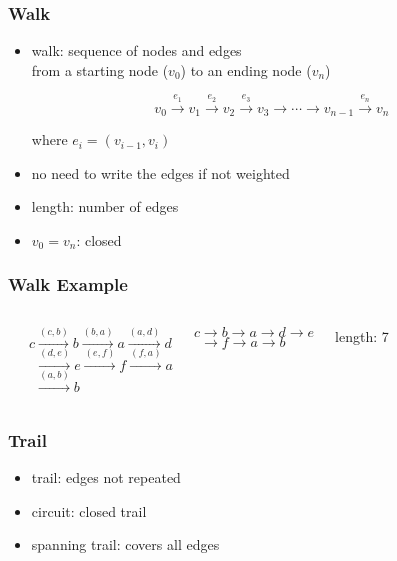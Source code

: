 \documentclass[dvipsnames]{beamer}
\begin{document}
\begin{frame}
  \frametitle{Walk}

  \begin{itemize}
    \item \alert{walk}: sequence of nodes and edges\\
      from a starting node ($v_0$) to an ending node ($v_n$)

    \[
      v_0 \xrightarrow{e_1} v_1 \xrightarrow{e_2} v_2 \xrightarrow{e_3} v_3
      \xrightarrow{} \cdots \xrightarrow{} v_{n-1} \xrightarrow{e_n} v_n
    \]

    where $e_i=(v_{i-1},v_i)$

    \item no need to write the edges if not weighted

    \pause
    \medskip
    \item \alert{length}: number of edges
    \item $v_0 = v_n$: \alert{closed}
  \end{itemize}
\end{frame}

\begin{frame}
  \frametitle{Walk Example}

  \begin{columns}
    \begin{center}
    \end{center}

    $c \xrightarrow{(c,b)} b \xrightarrow{(b,a)} a \xrightarrow{(a,d)} d$\\
    $~~\xrightarrow{(d,e)} e \xrightarrow{(e,f)} f \xrightarrow{(f,a)} a$\\
    $~~\xrightarrow{(a,b)} b$

    \medskip
    $c \rightarrow b \rightarrow a \rightarrow d \rightarrow e$\\
    $~~\rightarrow f \rightarrow a \rightarrow b$

    \bigskip
    length: 7
  \end{columns}
\end{frame}

\begin{frame}
  \frametitle{Trail}

  \begin{itemize}
    \item \alert{trail}: edges not repeated
    \item \alert{circuit}: closed trail
    \item \alert{spanning} trail: covers all edges
  \end{itemize}
\end{frame}
\end{document}
